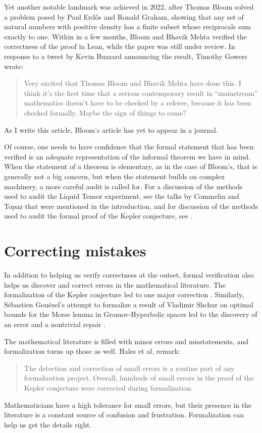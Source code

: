 \documentclass{amsart}
\theoremstyle{definition}
\theoremstyle{remark}
\numberwithin{equation}{section}
\begin{document}
Yet another notable landmark was achieved in 2022, after Thomas Bloom solved a problem posed by Paul Erd\H{o}s and Ronald Graham, showing that any set of natural numbers with positive density has a finite subset whose reciprocals sum exactly to one. Within in a few months, Bloom and Bhavik Mehta verified the correctness of the proof in Lean, while the paper was still under review. In response to a tweet by Kevin Buzzard announcing the result, Timothy Gowers wrote:
\begin{quote}
  Very excited that Thomas Bloom and Bhavik Mehta have done this. I think it's the first time that a serious contemporary result in ``mainstream'' mathematics doesn't have to be checked by a referee, because it has been checked formally. Maybe the sign of things to come?
\end{quote}
As I write this article, Bloom's article has yet to appear in a journal.

Of course, one needs to have confidence that the formal statement that has been verified is an adequate representation of the informal theorem we have in mind. When the statement of a theorem is elementary, as in the case of Bloom's, that is generally not a big concern, but when the statement builds on complex machinery, a more careful audit is called for. For a discussion of the methods used to audit the Liquid Tensor experiment, see the talks by Commelin and Topaz that were mentioned in the introduction, and for discussion of the methods used to audit the formal proof of the Kepler conjecture, see \cite[Section 10]{hales:et:al:17}.


\section{Correcting mistakes}

In addition to helping us verify correctness at the outset, formal verification also helps us discover and correct errors in the mathematical literature. The formalization of the Kepler conjecture led to one major correction \cite{hales:et:al:10}. Similarly, S\'ebastien Gou\"ezel's attempt to formalize a result of Vladimir Shchur on optimal bounds for the Morse lemma in Gromov-Hyperbolic spaces led to the discovery of an error and a nontrivial repair \cite{gouezel:shchur:19}.

The mathematical literature is filled with minor errors and misstatements, and formalization turns up those as well. Hales et al. remark:
\begin{quote}
The detection and correction of
small errors is a routine part of any formalization project. Overall, hundreds of small errors
in the proof of the Kepler conjecture were corrected during formalization. \cite[Section 4.3]{hales:et:al:17}
\end{quote}
Mathematicians have a high tolerance for small errors, but their presence in the literature is a constant source of confusion and frustration. Formalization can help us get the details right.
\end{document}
